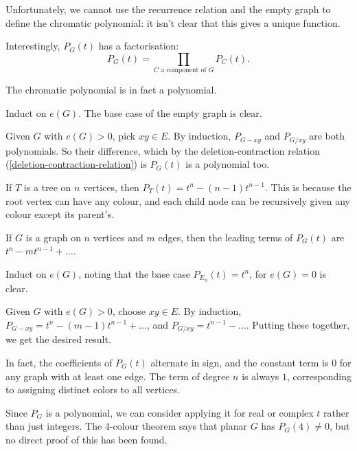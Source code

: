 \documentclass{article}
\begin{document}
Unfortunately, we cannot use the recurrence relation and the empty graph to define the chromatic polynomial: it isn't clear that this gives a unique function.

Interestingly, $P_G(t)$ has a factorisation:
\[
P_G(t) = \prod_{C \text{ a component of } G} P_C(t).
\]

\begin{proposition}[$P_G(t)$ is a Polynomial]
    The chromatic polynomial is in fact a polynomial.
\end{proposition}

\begin{prf}
    Induct on $e(G)$. The base case of the empty graph is clear.
    
    Given $G$ with $e(G) > 0$, pick $xy \in E$. By induction, $P_{G-xy}$ and $P_{G/xy}$ are both polynomials. So their difference, which by the deletion-contraction relation (\ref{deletion-contraction-relation}) is $P_G(t)$ is a polynomial too.
\end{prf}

If $T$ is a tree on $n$ vertices, then $P_T(t) = t^n - (n-1)t^{n-1}$. This is because the root vertex can have any colour, and each child node can be recursively given any colour except its parent's.

\begin{proposition}
    If $G$ is a graph on $n$ vertices and $m$ edges, then the leading terms of $P_G(t)$ are $t^n - mt^{n-1} + \dots$.
\end{proposition}

\begin{prf}
    Induct on $e(G)$, noting that the base case $P_{E_n}(t) = t^n$, for $e(G) = 0$ is clear.
    
    Given $G$ with $e(G) > 0$, choose $xy \in E$. By induction, $P_{G-xy} = t^n - (m-1)t^{n-1} + \dots$, and $P_{G/xy} = t^{n-1} - \dots$. Putting these together, we get the desired result.
\end{prf}

\begin{note}
	In fact, the coefficients of $P_G(t)$ alternate in sign, and the constant term is 0 for any graph with at least one edge. The term of degree $n$ is always $1$, corresponding to assigning distinct colors to all vertices.
\end{note}

Since $P_G$ is a polynomial, we can consider applying it for real or complex $t$ rather than just integers. The 4-colour theorem says that planar $G$ has $P_G(4) \neq 0$, but no direct proof of this has been found.
\end{document}
